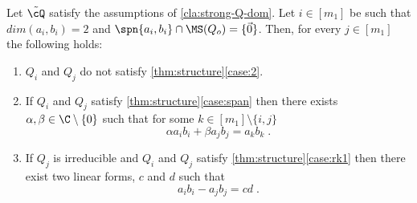 \begin{claim}\label{cla:span-rank1}
Let $\tilde\cQ$ satisfy  the assumptions of \autoref{cla:strong-Q-dom}. Let $i\in[m_1]$ be such that $dim(a_i,b_i) = 2$ and $\spn{a_i,b_i} \cap \MS(Q_o) = \{\vec{0}\}$. Then, for every $j\in [m_1]$ the following holds:
\begin{enumerate}
\item $Q_i$ and $Q_j$ do not satisfy \autoref{thm:structure}\ref{case:2}.

\item If $Q_i$ and $Q_j$ satisfy \autoref{thm:structure}\ref{case:span} then there exists $\alpha, \beta\in\C\setminus\{0\}$ such that for some $k\in[m_1]\setminus \{i,j\}$
\begin{equation} \label{eq:1-alpha}
 \alpha a_ib_i + \beta a_jb_j = a_k b_k \;. 
\end{equation}
\item If $Q_j$ is irreducible and $Q_i$ and $Q_j$ satisfy \autoref{thm:structure}\ref{case:rk1} then there exist two linear forms, $c$ and $d$ such that   
\begin{equation}
 a_ib_i -  a_jb_j = cd \;.
\end{equation}
\end{enumerate}
\end{claim}

